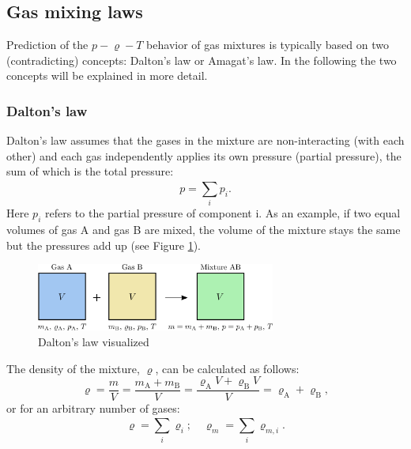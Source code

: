 \subsection{Gas mixing laws}
Prediction of the $p-\varrho-T$ behavior of gas mixtures is typically based on two (contradicting) concepts: Dalton's law or Amagat's law.
In the following the two concepts will be explained in more detail.
%
\subsubsection{Dalton's law}
Dalton's law assumes that the gases in the mixture are non-interacting (with each other) and each gas independently applies its own pressure (partial pressure), the sum of which is the total pressure:
%
\begin{equation}
p = \sum_{i}^{}p_i.
\end{equation}
Here $p_i$ refers to the partial pressure of component i.
As an example, if two equal volumes of gas A and gas B are mixed, the volume of the mixture stays the same but the pressures add up (see Figure \ref{fig:dalton1}).
%
\begin{figure}[ht]
	\centering
	\includegraphics[width=0.7\textwidth]{png/dalton1.png}
	\caption{Dalton's law visualized}
	\label{fig:dalton1}
\end{figure}
%
The density of the mixture, $\varrho$, can be calculated as follows:
\begin{equation}
\varrho = \frac{m}{V} = \frac{m_\mathrm{A} + m_\mathrm{B}}{V} = \frac{\varrho_\mathrm{A} V + \varrho_\mathrm{B} V}{V} = \varrho_\mathrm{A} + \varrho_\mathrm{B},
\end{equation}
%
or for an arbitrary number of gases:
\begin{equation}
\varrho = \sum_{i}^{} \varrho_i ; \quad \varrho_m = \sum_{i}^{} \varrho_{m,i}.
\end{equation}
%

